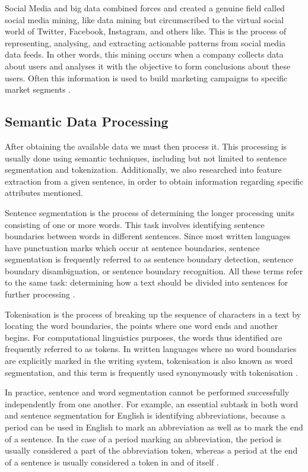 \documentclass[runningheads]{llncs}
\begin{document}
Social Media and big data combined forces and created a genuine field called social media mining, like data mining but circumscribed to the virtual social world of Twitter, Facebook, Instagram, and others like\cite{McCourt_2018}. This is the process of representing, analysing, and extracting actionable patterns from social media data feeds. In other words, this mining occurs when a company collects data about users and analyses it with the objective to form conclusions about these users. Often this information is used to build marketing campaigns to specific market segments \cite{McCourt_2018}.


\subsection{Semantic Data Processing}

After obtaining the available data we must then process it. This processing is usually done using semantic techniques, including but not limited to sentence segmentation and tokenization. Additionally, we also researched into feature extraction from a given sentence, in order to obtain information regarding specific attributes mentioned.

Sentence segmentation is the process of determining the longer processing units consisting of one or more words. This task involves identifying sentence boundaries between words in different sentences. Since most written languages have punctuation marks which occur at sentence boundaries, sentence segmentation is frequently referred to as sentence boundary detection, sentence boundary disambiguation, or sentence boundary recognition. All these terms refer to the same task: determining how a text should be divided into sentences for further processing \cite{dale2000handbook}.

Tokenisation is the process of breaking up the sequence of characters in a text by locating the word boundaries, the points where one word ends and another begins. For computational linguistics purposes, the words thus identified are frequently referred to as tokens. In written languages where no word boundaries are explicitly marked in the writing system, tokenisation is also known as word segmentation, and this term is frequently used synonymously with tokenisation \cite{dale2000handbook}.

In practice, sentence and word segmentation cannot be performed successfully independently from one another. For example, an essential subtask in both word and sentence segmentation for English is identifying abbreviations, because a period can be used in English to mark an abbreviation as well as to mark the end of a sentence. In the case of a period marking an abbreviation, the period is usually considered a part of the abbreviation token, whereas a period at the end of a sentence is usually considered a token in and of itself \cite{dale2000handbook}.
\end{document}
